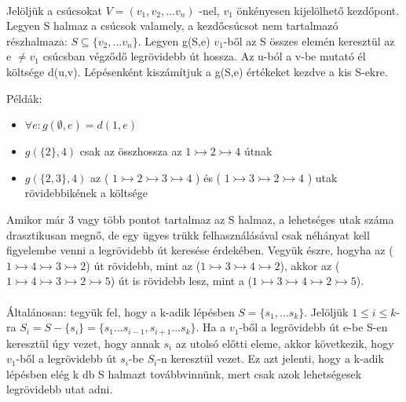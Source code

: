 \paragraph{}
Jelöljük a csúcsokat \( V=\left(v_1,v_2,\ldots v_n\right) \) -nel, \(v_1\) önkényesen kijelölhető kezdőpont. Legyen S halmaz a csúcsok valamely, a kezdőcsúcsot nem tartalmazó részhalmaza: \(S \subseteq \{v_2,...v_n\}\). Legyen g(S,e) \(v_1\)-ből az S összes elemén keresztül az e \(\neq v_1\)  csúcsban végződő legrövidebb út hossza. Az u-ból a v-be mutató él költsége d(u,v).
Lépésenként kiszámítjuk a g(S,e) értékeket kezdve a kis S-ekre.

Példák:
\begin{itemize}
	\item \(\forall e: g(\emptyset,e) = d(1,e)\)
	\item \(g(\{2\},4)\) csak az összhossza az  \(1 \rightarrowtail 2 \rightarrowtail 4\) útnak
	\item \(g(\{2,3\},4)\)  az ( \(1 \rightarrowtail 2 \rightarrowtail 3 \rightarrowtail 4\) ) és ( \(1 \rightarrowtail 3 \rightarrowtail 2 \rightarrowtail 4\) ) utak rövidebbikének a költsége
\end{itemize}

Amikor már 3 vagy több pontot tartalmaz az S halmaz, a lehetséges utak száma drasztikusan megnő, de egy ügyes trükk felhasználásával csak néhányat kell figyelembe venni a legrövidebb út keresése érdekében. Vegyük észre, hogyha az (\(1\rightarrowtail 4\rightarrowtail 3\rightarrowtail 2\)) út rövidebb, mint az (\(1\rightarrowtail 3\rightarrowtail 4\rightarrowtail 2\)), akkor az (\(1\rightarrowtail 4\rightarrowtail 3\rightarrowtail 2\rightarrowtail 5\)) út is rövidebb lesz, mint a (\(1\rightarrowtail 3\rightarrowtail 4\rightarrowtail 2\rightarrowtail 5\)).
\paragraph{}
Általánosan: tegyük fel, hogy a k-adik lépésben \(S=\{s_1,...s_k\}\). Jelöljük \(1\leqslant i\leqslant k\)-ra \(S_i = S-\{s_i\} = \{s_1...s_{i-1},s_{i+1}...s_k\} \). Ha a \(v_1\)-ből a legrövidebb út e-be S-en keresztül úgy vezet, hogy annak \(s_i\) az utolsó előtti eleme, akkor következik, hogy \(v_1\)-ből a legrövidebb út \(s_i\)-be \(S_i\)-n keresztül vezet. Ez azt jelenti, hogy a k-adik lépésben elég k db S halmazt továbbvinnünk, mert csak azok lehetségesek legrövidebb utat adni.

